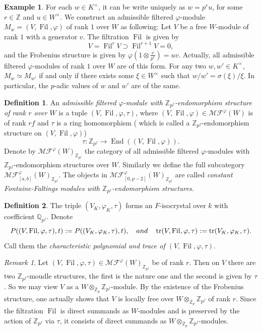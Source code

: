 \documentclass[12pt,twoside]{book}
\theoremstyle{plain}
\theoremstyle{definition}
\newtheorem{definition}[definition]{Definition}
\newtheorem{example}[example]{Example}
\theoremstyle{remark}
\newtheorem{remark}[remark]{Remark}
\newcommand{\bQ}{{\mathbb Q}}
\newcommand{\bZ}{{\mathbb Z}}
\DeclareMathOperator\End{End}
\DeclareMathOperator\Fil{Fil}
\newcommand{\MF}{\mathcal{MF}}
\numberwithin{equation}{section}
\begin{document}
\begin{example} For each $w \in K^\times$, it can be write uniquely as $w=p^ru$, for some $r\in\bZ$ and $u\in W^\times$. We construct an admissible filtered $\varphi$-module $M_w=(V,\Fil,\varphi)$ of rank $1$ over $W$ as following:
Let $V$ be a free $W$-module of rank $1$ with a generator $v$. The filtration $\Fil$ is given by
\[V = \Fil^rV\supset \Fil^{r+1}V=0,\]
and the Frobenius structure is given by $\varphi(1\otimes \frac{v}{p^r})=uv$. Actually, all admissible filtered $\varphi$-modules of rank $1$ over $W$ are of this form. For any two $w,w'\in K^\times$, $M_w\simeq M_{w'}$ if and only if there exists some $\xi\in W^\times$ such that $w/w'=\sigma(\xi)/\xi$. In particular, the $p$-adic values of $w$ and $w'$ are of the same.
\end{example}

\begin{definition}
An \emph{admissible filtered $\varphi$-module with $\bZ_{p^f}$-endomorphism structure of rank $r$ over $W$} is a tuple $(V,\Fil,\varphi,\tau)$, where $(V,\Fil,\varphi)\in \MF^\varphi(W)$ is of rank $rf$ and $\tau$ is a ring homomorphism ( which is called a $\bZ_{p^f}$-endomorphism structure on $(V,\Fil,\varphi)$)
\[\tau\colon \bZ_{p^f} \rightarrow \End((V,\Fil,\varphi)).\]
Denote by \emph{$\MF^\varphi(W)_{\bZ_{p^f}}$} the category of all admissible filtered $\varphi$-modules with $\bZ_{p^f}$-endomorphism structures over $W$. Similarly we define the full subcategory \emph{$\MF_{[a,b]}^\varphi(W)_{\bZ_{p^f}}$}. The objects in
$\MF_{[0,p-2]}^\varphi(W)_{\bZ_{p^f}}$ are called \emph{constant Fontaine-Faltings modules with $\bZ_{p^f}$-endomorphism structures}.
\end{definition}

\begin{definition} The triple $(V_K,\varphi_K,\tau)$ forms an $F$-isocrystal over $k$ with coefficient $\bQ_{p^f}$.
Denote
\[P((V,\Fil,\varphi,\tau),t):=P((V_K,\varphi_K,\tau),t),\quad and \quad \tr(V,\Fil,\varphi,\tau) := \tr(V_K,\varphi_K,\tau).\]
Call them the \emph{characteristic polynomial and trace of $(V,\Fil,\varphi,\tau)$}.
\end{definition}

\begin{remark} Let $(V,\Fil,\varphi,\tau) \in \MF^\varphi(W)_{\bZ_{p^f}}$ be of rank $r$. Then on $V$ there are two $\bZ_{p^f}$-moudle structures, the first is the nature one and the second is given by $\tau$. So we may view $V$ as a $W\otimes_{\bZ_p}\bZ_{p^f}$-module. By the existence of the Frobenius structure, one actually shows that $V$ is locally free over $W\otimes_{\bZ_p}\bZ_{p^f}$ of rank $r$. Since the filtration $\Fil$ is direct summands as $W$-modules and is preserved by the action of $\bZ_{p^f}$ via $\tau$, it consists of direct summands as $W\otimes_{\bZ_p}\bZ_{p^f}$-modules.
\end{remark}
\end{document}
